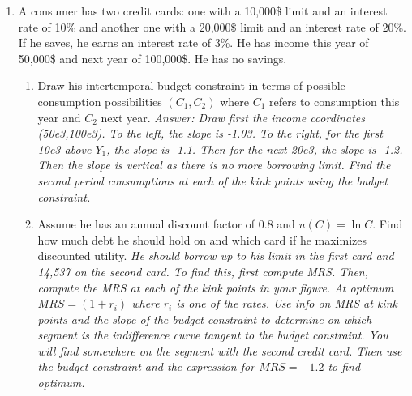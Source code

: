 \documentclass[11pt, oneside,french]{article}   	%
\begin{document}
\begin{enumerate}
  \item A consumer has two credit cards: one with a 10,000\$ limit and an interest rate of 10\% and another one with a 20,000\$ limit and an interest rate of 20\%. If he saves, he earns an interest rate of 3\%. He has income this year of 50,000\$ and next year of 100,000\$. He has no savings.
  \begin{enumerate}
  \item Draw his intertemporal budget constraint in terms of possible consumption possibilities $(C_1,C_2)$ where $C_1$ refers to consumption this year and $C_2$ next year. \textit{Answer: Draw first the income coordinates (50e3,100e3). To the left, the slope is -1.03. To the right, for the first 10e3 above $Y_1$, the slope is -1.1. Then for the next 20e3, the slope is -1.2. Then the slope is vertical as there is no more borrowing limit. Find the second period consumptions at each of the kink points using the budget constraint.} 
  \item Assume he has an annual discount factor of 0.8 and $u(C) = \ln C$. Find how much debt he should hold on and which card if he maximizes discounted utility. \textit{He should borrow up to his limit in the first card and 14,537 on the second card. To find this, first compute MRS. Then, compute the MRS at each of the kink points in your figure. At optimum $MRS = (1+r_i)$ where $r_i$ is one of the rates. Use info on MRS at kink points and the slope of the budget constraint to determine on which segment is the indifference curve tangent to the budget constraint. You will find somewhere on the segment with the second credit card. Then use the budget constraint and the expression for $MRS = -1.2$ to find optimum. } 
  \end{enumerate}
\end{enumerate}
\end{document}
